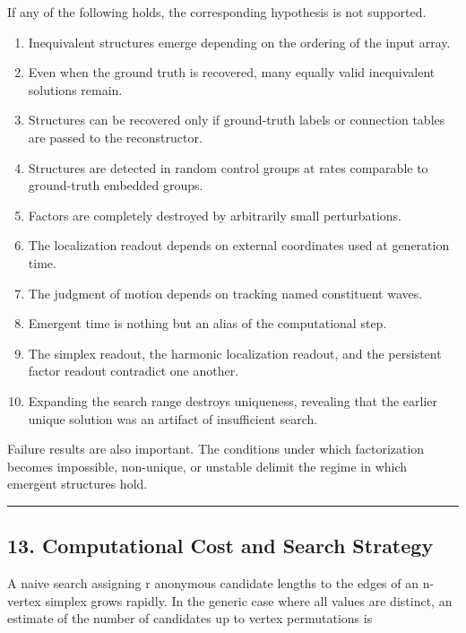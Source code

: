 \documentclass[
  a4paper,
]{article}
\providecommand{\tightlist}{%
  \setlength{\itemsep}{0pt}\setlength{\parskip}{0pt}}
\begin{document}
If any of the following holds, the corresponding hypothesis is not
supported.

\begin{enumerate}
\def\labelenumi{\arabic{enumi}.}
\tightlist
\item
  Inequivalent structures emerge depending on the ordering of the input
  array.
\item
  Even when the ground truth is recovered, many equally valid
  inequivalent solutions remain.
\item
  Structures can be recovered only if ground-truth labels or connection
  tables are passed to the reconstructor.
\item
  Structures are detected in random control groups at rates comparable
  to ground-truth embedded groups.
\item
  Factors are completely destroyed by arbitrarily small perturbations.
\item
  The localization readout depends on external coordinates used at
  generation time.
\item
  The judgment of motion depends on tracking named constituent waves.
\item
  Emergent time is nothing but an alias of the computational step.
\item
  The simplex readout, the harmonic localization readout, and the
  persistent factor readout contradict one another.
\item
  Expanding the search range destroys uniqueness, revealing that the
  earlier unique solution was an artifact of insufficient search.
\end{enumerate}

Failure results are also important. The conditions under which
factorization becomes impossible, non-unique, or unstable delimit the
regime in which emergent structures hold.

\begin{center}\rule{0.5\linewidth}{0.5pt}\end{center}

\subsection{13. Computational Cost and Search
Strategy}\label{computational-cost-and-search-strategy}

A naive search assigning r anonymous candidate lengths to the edges of
an n-vertex simplex grows rapidly. In the generic case where all values
are distinct, an estimate of the number of candidates up to vertex
permutations is
\end{document}
